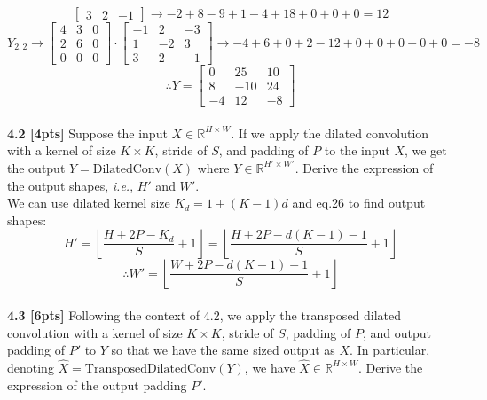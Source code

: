 \documentclass{article}
\begin{document}
{\begin{equation}
\begin{bmatrix}
        3&2&-1
    \end{bmatrix}
    \rightarrow -2+8-9+1-4+18+0+0+0=12
\end{equation}
\begin{equation}
    Y_{2,2} \rightarrow
    \begin{bmatrix}
        4&3&0\\
        2&6&0\\
        0&0&0
    \end{bmatrix}
    \cdot 
    \begin{bmatrix}
        -1&2&-3\\
        1&-2&3\\
        3&2&-1
    \end{bmatrix}
    \rightarrow -4+6+0+2-12+0+0+0+0+0=-8
\end{equation}
\begin{equation}
    \therefore Y=
    \begin{bmatrix}
        0&25&10\\
        8&-10&24\\
        -4&12&-8
    \end{bmatrix}
\end{equation}
}\\

\noindent
\textbf{4.2 [4pts]} Suppose the input $X \in \mathbb{R}^{H \times W}$. If we apply the dilated convolution with a kernel of size $K \times K$, stride of $S$, and padding of $P$ to the input $X$, we get the output $Y = \text{DilatedConv}(X)$ where $Y \in \mathbb{R}^{H' \times W'}$. Derive the expression of the output shapes, \textit{i.e.}, $H'$ and $W'$.\\

{\color{blue}
We can use dilated kernel size $K_d=1+(K-1)d$ and eq.26 to find output shapes:
\begin{equation}
    H'= \left \lfloor \frac{H+2P-K_d}{S}+1 \right \rfloor= \left \lfloor \frac{H+2P-d(K-1)-1}{S}+1 \right \rfloor
\end{equation}
\begin{equation}
    \therefore W'= \left \lfloor \frac{W+2P-d(K-1)-1}{S}+1 \right \rfloor
\end{equation}
}\\

\noindent
\textbf{4.3 [6pts]} Following the context of 4.2, we apply the transposed dilated convolution with a kernel of size $K \times K$, stride of $S$, padding of $P$, and output padding of $P'$ to $Y$ so that we have the same sized output as $X$. In particular, denoting $\hat{X} = \text{TransposedDilatedConv}(Y)$, we have $\hat{X} \in \mathbb{R}^{H \times W}$. Derive the expression of the output padding $P'$.\\
\end{document}
